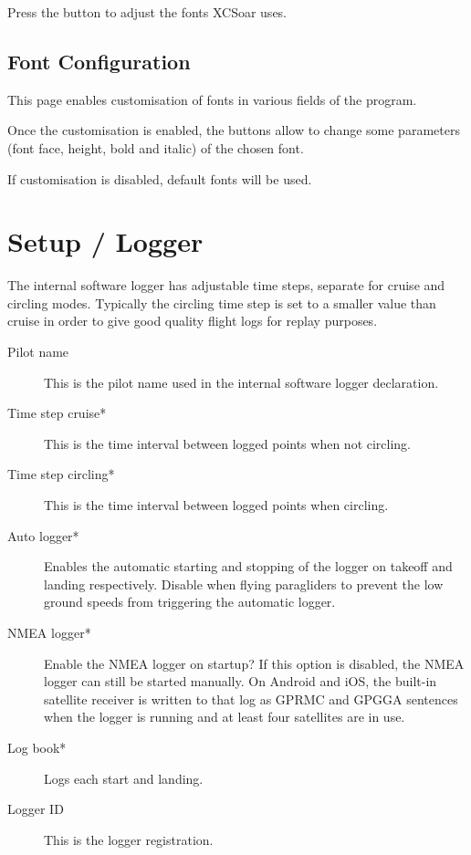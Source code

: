 Press the  button to adjust the fonts XCSoar uses.

\subsection*{Font Configuration}

This page enables customisation of fonts in various fields of the program.


Once the customisation is enabled, the  buttons allow to change 
some parameters (font face, height, bold and italic) of the chosen font.

If customisation is disabled, default fonts will be used.


\section{Setup / Logger} \label{conf:logger}

The internal software logger has adjustable time steps, separate for
cruise and circling modes.  
Typically the circling time step is set to a smaller value
than cruise in order to give good quality flight logs for replay
purposes.

\begin{description}
\item[Pilot name]  This is the pilot name used in the internal software logger 
  declaration.
\item[Time step cruise*]  This is the time interval between logged points when 
  not circling. 
\item[Time step circling*]  This is the time interval between logged points when 
  circling. 
\item[Auto logger*]  Enables the automatic starting and stopping of the logger
  on takeoff and landing respectively. Disable when flying paragliders to prevent 
  the low ground speeds from triggering the automatic logger.
\item[NMEA logger*]  Enable the NMEA logger on startup? If this option is disabled, 
  the NMEA logger can still be started manually.  On Android and iOS,
  the built-in satellite receiver is written to that log as GPRMC and
  GPGGA sentences when the logger is running and at least four
  satellites are in use.
\item[Log book*]  Logs each start and landing.
\item[Logger ID]  This is the logger registration.
\end{description}


